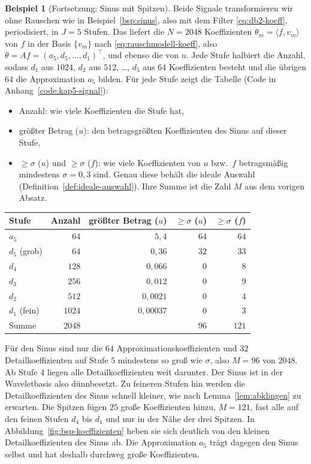 \documentclass[a4paper,11pt,bibliography=totoc,listof=totoc,headinclude=true,cleardoublepage=empty,oneside]{scrbook}
\theoremstyle{plain}
\theoremstyle{definition}
\newtheorem{Beispiel}[Satz]{Beispiel}
\newcommand{\scal}[2]{\langle #1, #2 \rangle}
\begin{document}
\begin{Beispiel}[Fortsetzung: Sinus mit Spitzen]
Beide Signale transformieren wir ohne Rauschen wie in Beispiel~\ref{bsp:sinus},
also mit dem Filter \eqref{eq:db2-koeff}, periodisiert, in $J = 5$ Stufen. Das
liefert die $N = 2048$ Koeffizienten $\theta_m = \scal{f}{v_m}$ von $f$ in der
Basis $\{v_m\}$ nach \eqref{eq:rauschmodell-koeff}, also
$\theta = Af = (a_5, d_5, \dots, d_1)^\top$, und ebenso die von $u$. Jede Stufe
halbiert die Anzahl, sodass $d_1$ aus $1024$, $d_2$ aus $512$, \dots, $d_5$ aus
$64$ Koeffizienten besteht und die übrigen $64$ die Approximation $a_5$ bilden.
Für jede Stufe zeigt die Tabelle (Code in Anhang~\ref{code:kap5-signal}):
\begin{itemize}
\item Anzahl: wie viele Koeffizienten die Stufe hat,
\item grö\ss ter Betrag ($u$): den betragsgrö\ss ten Koeffizienten des Sinus auf
  dieser Stufe,
\item $\ge\sigma$ ($u$) und $\ge\sigma$ ($f$): wie viele Koeffizienten von $u$
  bzw.\ $f$ betragsmä\ss ig mindestens $\sigma = 0{,}3$ sind. Genau diese
  behält die ideale Auswahl (Definition~\ref{def:ideale-auswahl}). Ihre Summe
  ist die Zahl $M$ aus dem vorigen Absatz.
\end{itemize}
\begin{center}
\begin{tabular}{lrrrr}
  \hline
  Stufe & Anzahl & grö\ss ter Betrag ($u$) & $\ge\sigma$ ($u$) & $\ge\sigma$ ($f$)\\
  \hline
  $a_5$          &   $64$ & $5{,}4$    & $64$ & $64$\\
  $d_5$ (grob)   &   $64$ & $0{,}36$    & $32$ & $33$\\
  $d_4$          &  $128$ & $0{,}066$   &  $0$ &  $8$\\
  $d_3$          &  $256$ & $0{,}012$   &  $0$ &  $9$\\
  $d_2$          &  $512$ & $0{,}0021$  &  $0$ &  $4$\\
  $d_1$ (fein)   & $1024$ & $0{,}00037$ &  $0$ &  $3$\\
  \hline
  Summe          & $2048$ &             & $96$ & $121$\\
  \hline
\end{tabular}
\end{center}
Für den Sinus sind nur die $64$ Approximationskoeffizienten und $32$
Detailkoeffizienten auf Stufe $5$ mindestens so gro\ss{} wie $\sigma$, also
$M = 96$ von $2048$. Ab Stufe $4$ liegen alle Detailkoeffizienten weit
darunter. Der Sinus ist in der Waveletbasis also dünnbesetzt. Zu feineren
Stufen hin werden die Detailkoeffizienten des Sinus schnell kleiner, wie nach
Lemma~\ref{lem:abklingen} zu erwarten. Die Spitzen fügen $25$ gro\ss e
Koeffizienten hinzu, $M = 121$, fast alle auf den feinen Stufen $d_4$ bis
$d_1$ und nur in der Nähe der drei Spitzen. In
Abbildung~\ref{fig:bsp-koeffizienten} heben sie sich deutlich von den
kleinen Detailkoeffizienten des Sinus ab. Die Approximation $a_5$ trägt dagegen
den Sinus selbst und hat deshalb durchweg gro\ss e Koeffizienten.
 

\end{Beispiel}
\end{document}
